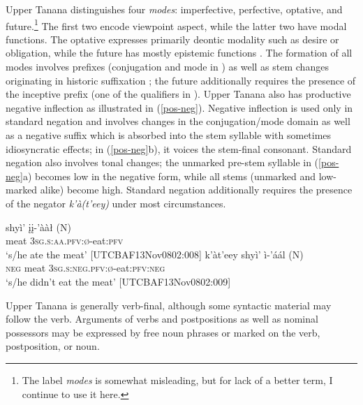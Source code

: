 \documentclass[output=paper,colorlinks,citecolor=brown
]{langscibook}
\begin{document}
Upper Tanana distinguishes four \textit{modes}: imperfective, perfective, optative, and future.\footnote{The label \textit{modes} is somewhat misleading, but for lack of a better term, I continue to use it here.} The first two encode viewpoint aspect, while the latter two have modal functions. The optative expresses primarily deontic modality such as desire or obligation, while the future has mostly epistemic functions \citep{LovickO2017}. The formation of all modes involves prefixes (conjugation and mode in ) as well as stem changes originating in historic suffixation \citep{LeerJ1979}; the future additionally requires the presence of the inceptive prefix (one of the qualifiers in ). Upper Tanana also has productive negative inflection as illustrated in (\ref{pos-neg}). Negative inflection is used only in standard negation and involves changes in the conjugation/mode domain as well as a negative suffix which is absorbed into the stem syllable with sometimes idiosyncratic effects; in (\ref{pos-neg}b), it voices the stem-final consonant. Standard negation also involves tonal changes; the unmarked pre-stem syllable in (\ref{pos-neg}a) becomes low in the negative form, while all stems (unmarked and low-marked alike) become high. Standard negation additionally requires the presence of the negator \textit{k'à(t'eey)} under most circumstances.

\begin{exe}
\ex \label{pos-neg}
\begin{xlista}
\ex
\gll shyì' {įį-'ààł \textnormal{(N)}}\\
meat \textsc{3sg.s:aa.pfv:ø}-eat:\textsc{pfv} \\
\glt `s/he ate the meat'  \hfill [UTCBAF13Nov0802:008]
\ex 
\gll k'àt'eey shyì' {ì-'áál \textnormal{(N)}}\\
\textsc{neg} meat \textsc{3sg.s:neg.pfv:ø}-eat:\textsc{pfv:neg} \\
\glt `s/he didn't eat the meat'  \hfill [UTCBAF13Nov0802:009] 
\end{xlista}
\end{exe}


Upper Tanana is generally verb-final, although some syntactic material may follow the verb. Arguments of verbs and postpositions as well as nominal possessors may be expressed by free noun phrases or marked on the verb, postposition, or noun.%
\end{document}
